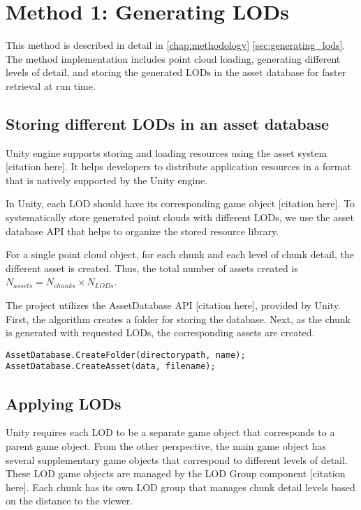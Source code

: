 \section{Method 1: Generating LODs}

This method is described in detail in \autoref{chap:methodology} \autoref{sec:generating_lods}. The method implementation includes point cloud loading, generating different levels of detail, and storing the generated LODs in the asset database for faster retrieval at run time.

\subsection{Storing different LODs in an asset database}

Unity engine supports storing and loading resources using the asset system [citation here]. It helps developers to distribute application resources in a format that is natively supported by the Unity engine.

In Unity, each LOD should have its corresponding game object [citation here]. To systematically store generated point clouds with different LODs, we use the asset database API that helps to organize the stored resource library.

For a single point cloud object, for each chunk and each level of chunk detail, the different asset is created. Thus, the total number of assets created is $N_{assets}=N_{chunks}\times N_{LODs}$.

The project utilizes the AssetDatabase API [citation here], provided by Unity. First, the algorithm creates a folder for storing the database. Next, as the chunk is generated with requested LODs, the corresponding assets are created.

\texttt{AssetDatabase.CreateFolder(directorypath, name);}
\texttt{AssetDatabase.CreateAsset(data, filename);}

\subsection{Applying LODs}

Unity requires each LOD to be a separate game object that corresponds to a parent game object. From the other perspective, the main game object has several supplementary game objects that correspond to different levels of detail. These LOD game objects are managed by the LOD Group component [citation here]. Each chunk has its own LOD group that manages chunk detail levels based on the distance to the viewer.


